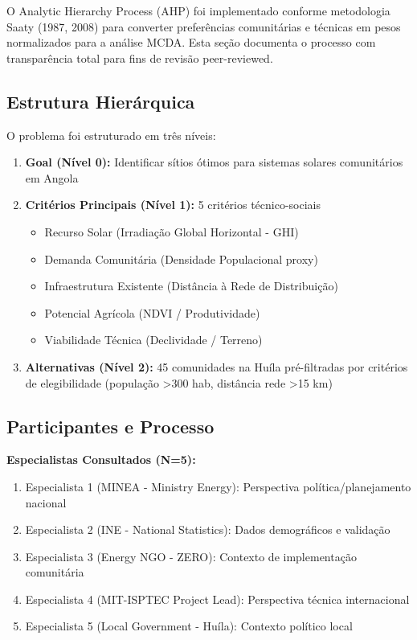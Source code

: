 \documentclass[12pt, a4paper]{article}
\begin{document}
\begin{itemize}
O Analytic Hierarchy Process (AHP) foi implementado conforme metodologia Saaty (1987, 2008) para converter preferências comunitárias e técnicas em pesos normalizados para a análise MCDA. Esta seção documenta o processo com transparência total para fins de revisão peer-reviewed.

\subsection{Estrutura Hierárquica}

O problema foi estruturado em três níveis:

\begin{enumerate}
\item \textbf{Goal (Nível 0):} Identificar sítios ótimos para sistemas solares comunitários em Angola

\item \textbf{Critérios Principais (Nível 1):} 5 critérios técnico-sociais
\begin{itemize}
    \item Recurso Solar (Irradiação Global Horizontal - GHI)
    \item Demanda Comunitária (Densidade Populacional proxy)
    \item Infraestrutura Existente (Distância à Rede de Distribuição)
    \item Potencial Agrícola (NDVI / Produtividade)
    \item Viabilidade Técnica (Declividade / Terreno)
\end{itemize}

\item \textbf{Alternativas (Nível 2):} 45 comunidades na Huíla pré-filtradas por critérios de elegibilidade (população >300 hab, distância rede >15 km)

\end{enumerate}

\subsection{Participantes e Processo}

\textbf{Especialistas Consultados (N=5):}
\begin{enumerate}
\item Especialista 1 (MINEA - Ministry Energy): Perspectiva política/planejamento nacional
\item Especialista 2 (INE - National Statistics): Dados demográficos e validação
\item Especialista 3 (Energy NGO - ZERO):  Contexto de implementação comunitária
\item Especialista 4 (MIT-ISPTEC Project Lead): Perspectiva técnica internacional
\item Especialista 5 (Local Government - Huíla): Contexto político local
\end{enumerate}


\end{itemize}
\end{document}
